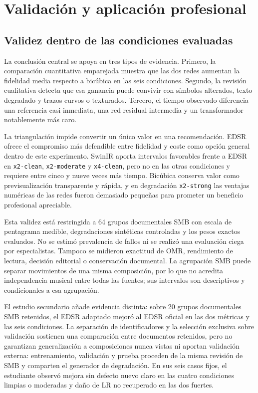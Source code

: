 \chapter{Validación y aplicación profesional}

\section{Validez dentro de las condiciones evaluadas}
La conclusión central se apoya en tres tipos de evidencia. Primero, la comparación cuantitativa
emparejada muestra que las dos redes aumentan la fidelidad media respecto a bicúbica en las seis
condiciones. Segundo, la revisión cualitativa detecta que esa ganancia puede convivir con símbolos
alterados, texto degradado y trazos curvos o texturados. Tercero, el tiempo observado diferencia una
referencia casi inmediata, una red residual intermedia y un transformador notablemente más caro.

La triangulación impide convertir un único valor en una recomendación. EDSR ofrece el compromiso
más defendible entre fidelidad y coste como opción general dentro de este experimento. SwinIR aporta
intervalos favorables frente a EDSR en \texttt{x2-clean}, \texttt{x2-moderate} y
\texttt{x4-clean}, pero no en las otras condiciones y requiere entre cinco y nueve veces más
tiempo. Bicúbica conserva valor como previsualización transparente y rápida, y en degradación
\texttt{x2-strong} las ventajas numéricas de las redes fueron demasiado pequeñas para prometer un
beneficio profesional apreciable.

Esta validez está restringida a 64 grupos documentales SMB con escala de pentagrama medible, degradaciones
sintéticas controladas y los pesos exactos evaluados. No se estimó prevalencia de fallos ni se
realizó una evaluación ciega por especialistas. Tampoco se midieron exactitud de OMR, rendimiento de
lectura, decisión editorial o conservación documental. La agrupación SMB puede separar movimientos
de una misma composición, por lo que no acredita independencia musical entre todas las fuentes;
sus intervalos son descriptivos y condicionales a esa agrupación.

El estudio secundario añade evidencia distinta: sobre 20 grupos documentales SMB retenidos, el EDSR adaptado mejoró
al EDSR oficial en las dos métricas y las seis condiciones. La separación de identificadores y la
selección exclusiva sobre validación sostienen una comparación entre documentos retenidos, pero
no garantizan generalización a composiciones nunca vistas ni aportan validación externa:
entrenamiento, validación y prueba proceden de la misma revisión de SMB y
comparten el generador de degradación. En sus seis casos fijos, el estudiante observó mejora sin
defecto nuevo claro en las cuatro condiciones limpias o moderadas y daño de LR no recuperado en las
dos fuertes.

